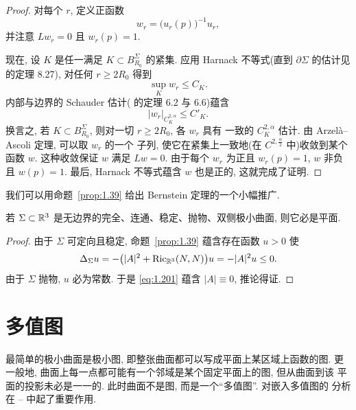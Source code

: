 \begin{proof}
对每个 $r$, 定义正函数
\begin{equation}
w_r=\bigl(u_r(p)\bigr)^{-1}u_r,
\label{eq:1.198}
\end{equation}
并注意 $Lw_r=0$ 且 $w_r(p)=1$.

现在, 设 $K$ 是任一满足 $K\subset B_{R_0}^{\Sigma}$ 的紧集. 应用 Harnack
不等式(直到 $\partial\Sigma$ 的估计见 \cite{GiTr} 的定理 8.27), 对任何
$r\geq2R_0$ 得到
\begin{equation}
\sup_K w_r\leq C_K.
\label{eq:1.199}
\end{equation}
内部与边界的 Schauder 估计(\cite{GiTr} 的定理 6.2 与 6.6)蕴含
\begin{equation}
|w_r|_{C_K^{2,\alpha}}\leq C'_K.
\label{eq:1.200}
\end{equation}
换言之, 若 $K\subset B_{R_0}^{\Sigma}$, 则对一切 $r\geq2R_0$, 各 $w_r$ 具有
一致的 $C_K^{2,\alpha}$ 估计. 由 Arzel\`a--Ascoli 定理, 可以取 $w_r$ 的一个
子列, 使它在紧集上一致地(在 $C^{2,\frac{\alpha}{2}}$ 中)收敛到某个函数 $w$.
这种收敛保证 $w$ 满足 $Lw=0$. 由于每个 $w_r$ 为正且 $w_r(p)=1$, $w$ 非负
且 $w(p)=1$. 最后, Harnack 不等式蕴含 $w$ 也是正的, 这就完成了证明.
\end{proof}

我们可以用命题~\ref{prop:1.39} 给出 Bernstein 定理的一个小幅推广.

\begin{corollary}
\label{cor:1.40}
若 $\Sigma\subset\mathbb{R}^3$ 是无边界的完全、连通、稳定、抛物、双侧极小曲面,
则它必是平面.
\end{corollary}

\begin{proof}
由于 $\Sigma$ 可定向且稳定, 命题~\ref{prop:1.39} 蕴含存在函数 $u>0$ 使
\begin{equation}
\Delta_{\Sigma}u
 =-\bigl(|A|^{2}+\operatorname{Ric}_{\mathbb{R}^3}(N,N)\bigr)u
 =-|A|^{2}u\leq0.
\label{eq:1.201}
\end{equation}
由于 $\Sigma$ 抛物, $u$ 必为常数. 于是 \eqref{eq:1.201} 蕴含 $|A|\equiv0$, 推论得证.
\end{proof}

\section{多值图}
\label{sec:1.9}

最简单的极小曲面是极小图, 即整张曲面都可以写成平面上某区域上函数的图. 更
一般地, 曲面上每一点都可能有一个邻域是某个固定平面上的图, 但从曲面到该
平面的投影未必是一一的. 此时曲面不是图, 而是一个``多值图''. 对嵌入多值图的
分析在 \cite{CM2}--\cite{CM7} 中起了重要作用.

